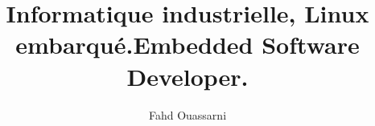 
\author{Fahd Ouassarni}

\ifdefined\islangfr
\title{Informatique industrielle, Linux embarqué.}
\else\fi

\ifdefined\islangen
\title{Embedded Software Developer.}
\else\fi

\address{6 Boulevard Mar\'echal Juin\\
         14000 CAEN}

\maketitle
